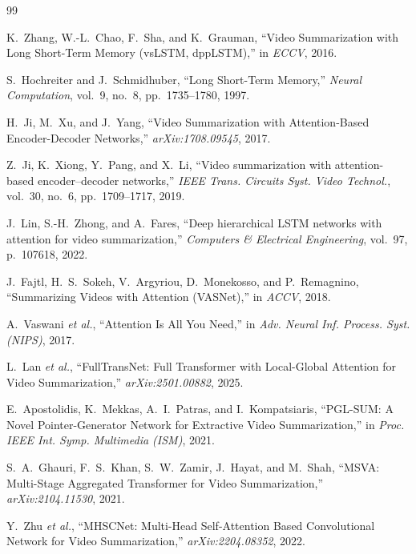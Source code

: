 \documentclass[10pt,conference]{IEEEtran}
\begin{document}
\begin{thebibliography}{99}

K.~Zhang, W.-L.~Chao, F.~Sha, and K.~Grauman,
``Video Summarization with Long Short-Term Memory (vsLSTM, dppLSTM),''
in \textit{ECCV}, 2016.

S.~Hochreiter and J.~Schmidhuber,
``Long Short-Term Memory,''
\textit{Neural Computation}, vol.~9, no.~8, pp.~1735--1780, 1997.

H.~Ji, M.~Xu, and J.~Yang,
``Video Summarization with Attention-Based Encoder-Decoder Networks,''
\textit{arXiv:1708.09545}, 2017.

Z.~Ji, K.~Xiong, Y.~Pang, and X.~Li,
``Video summarization with attention-based encoder--decoder networks,''
\textit{IEEE Trans. Circuits Syst. Video Technol.}, vol.~30, no.~6,
pp.~1709--1717, 2019.

J.~Lin, S.-H.~Zhong, and A.~Fares,
``Deep hierarchical LSTM networks with attention for video summarization,''
\textit{Computers \& Electrical Engineering}, vol.~97, p.~107618, 2022.


J.~Fajtl, H.~S.~Sokeh, V.~Argyriou, D.~Monekosso, and P.~Remagnino,
``Summarizing Videos with Attention (VASNet),''
in \textit{ACCV}, 2018.

A.~Vaswani \textit{et al.},
``Attention Is All You Need,''
in \textit{Adv. Neural Inf. Process. Syst. (NIPS)}, 2017.

L.~Lan \textit{et al.},
``FullTransNet: Full Transformer with Local-Global Attention for Video
Summarization,''
\textit{arXiv:2501.00882}, 2025.

E.~Apostolidis, K.~Mekkas, A.~I.~Patras, and I.~Kompatsiaris,
``PGL-SUM: A Novel Pointer-Generator Network for Extractive Video
Summarization,'' in \textit{Proc. IEEE Int. Symp. Multimedia (ISM)}, 2021.

S.~A.~Ghauri, F.~S.~Khan, S.~W.~Zamir, J.~Hayat, and M.~Shah,
``MSVA: Multi-Stage Aggregated Transformer for Video Summarization,''
\textit{arXiv:2104.11530}, 2021.

Y.~Zhu \textit{et al.},
``MHSCNet: Multi-Head Self-Attention Based Convolutional Network for Video
Summarization,'' \textit{arXiv:2204.08352}, 2022.


\end{thebibliography}
\end{document}

